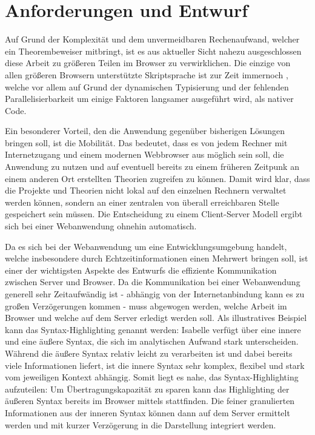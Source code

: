 \chapter{Anforderungen und Entwurf}
\label{sec:draft}

Auf Grund der Komplexität und dem unvermeidbaren Rechenaufwand, welcher ein Theorembeweiser
mitbringt, ist es aus aktueller Sicht nahezu ausgeschlossen diese Arbeit zu größeren Teilen im
Browser zu verwirklichen. Die einzige von allen größeren Browsern unterstützte Skriptsprache ist zur
Zeit immernoch , welche vor allem auf Grund der dynamischen Typisierung und der
fehlenden Parallelisierbarkeit um einige Faktoren langsamer ausgeführt wird, als nativer Code.

Ein besonderer Vorteil, den die Anwendung gegenüber bisherigen Lösungen bringen soll, ist die
Mobilität. Das bedeutet, dass es von jedem Rechner mit Internetzugang und einem modernen Webbrowser
aus möglich sein soll, die Anwendung zu nutzen und auf eventuell bereits zu einem früheren Zeitpunk
an einem anderen Ort erstellten Theorien zugreifen zu können. Damit wird klar, dass die Projekte und
Theorien nicht lokal auf den einzelnen Rechnern verwaltet werden können, sondern an einer zentralen
von überall erreichbaren Stelle gespeichert sein müssen. Die Entscheidung zu einem Client-Server
Modell ergibt sich bei einer Webanwendung ohnehin automatisch.

Da es sich bei der Webanwendung um eine Entwicklungsumgebung handelt, welche insbesondere durch
Echtzeitinformationen einen Mehrwert bringen soll, ist einer der wichtigsten Aspekte des Entwurfs
die effiziente Kommunikation zwischen Server und Browser. Da die Kommunikation bei einer
Webanwendung generell sehr Zeitaufwändig ist - abhängig von der Internetanbindung kann es zu großen
Verzögerungen kommen - muss abgewogen werden, welche Arbeit im Browser und welche auf dem Server
erledigt werden soll. Als illustratives Beispiel kann das Syntax-Highlighting genannt werden:
Isabelle verfügt über eine innere und eine äußere Syntax, die sich im analytischen Aufwand stark
unterscheiden. Während die äußere Syntax relativ leicht zu verarbeiten ist und dabei bereits viele
Informationen liefert, ist die innere Syntax sehr komplex, flexibel und stark vom jeweiligen Kontext
abhängig. Somit liegt es nahe, das Syntax-Highlighting aufzuteilen: Um Übertragungskapazität zu
sparen kann das Highlighting der äußeren Syntax bereits im Browser mittels  stattfinden. Die
feiner granulierten Informationen aus der inneren Syntax können dann auf dem Server ermittelt werden
und mit kurzer Verzögerung in die Darstellung integriert werden.



\clearpage



\clearpage

